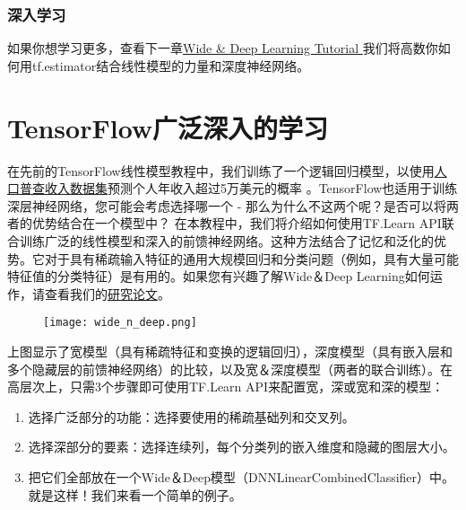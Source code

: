 \subsubsection{深入学习}
如果你想学习更多，查看下一章\href{https://www.tensorflow.org/tutorials/wide_and_deep}{Wide \& Deep Learning Tutorial }我们将高数你如何用tf.estimator结合线性模型的力量和深度神经网络。
\section{TensorFlow广泛深入的学习}
在先前的TensorFlow线性模型教程中，我们训练了一个逻辑回归模型，以使用\href{https://archive.ics.uci.edu/ml/datasets/Census+Income}{人口普查收入数据集}预测个人年收入超过5万美元的概率 。TensorFlow也适用于训练深层神经网络，您可能会考虑选择哪一个 - 那么为什么不这两个呢？是否可以将两者的优势结合在一个模型中？
在本教程中，我们将介绍如何使用TF.Learn API联合训练广泛的线性模型和深入的前馈神经网络。这种方法结合了记忆和泛化的优势。它对于具有稀疏输入特征的通用大规模回归和分类问题（例如，具有大量可能特征值的分类特征）是有用的。如果您有兴趣了解Wide＆Deep Learning如何运作，请查看我们的\href{http://arxiv.org/abs/1606.07792}{研究论文}。
\begin{figure}[H]
	\centering
	\texttt{[image: wide\_n\_deep.png]}
\end{figure}
上图显示了宽模型（具有稀疏特征和变换的逻辑回归），深度模型（具有嵌入层和多个隐藏层的前馈神经网络）的比较，以及宽＆深度模型（两者的联合训练）。在高层次上，只需3个步骤即可使用TF.Learn API来配置宽，深或宽和深的模型：
\begin{enumerate}
\item 选择广泛部分的功能：选择要使用的稀疏基础列和交叉列。
\item 选择深部分的要素：选择连续列，每个分类列的嵌入维度和隐藏的图层大小。
\item 把它们全部放在一个Wide＆Deep模型（DNNLinearCombinedClassifier）中。
就是这样！我们来看一个简单的例子。
\end{enumerate}
